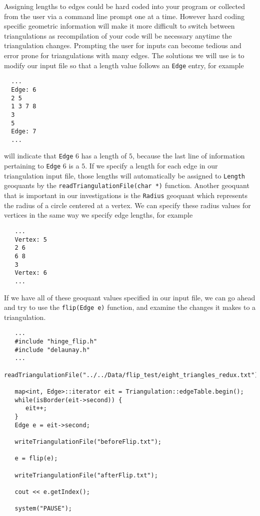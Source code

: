 \documentclass{amsart}
\theoremstyle{plain}
\numberwithin{equation}{section}
\begin{document}
Assigning lengths to edges could be hard coded into your program or collected from the user via a command line prompt one at a time. However hard coding specific geometric information will make it more difficult to switch between triangulations as recompilation of your code will be necessary anytime the triangulation changes. Prompting the user for inputs can become tedious and error prone for triangulations with many edges. The solutions we will use is to modify our input file so that a length value follows an \verb|Edge| entry, for example\\

\begin{verbatim}
  ...
  Edge: 6
  2 5
  1 3 7 8 
  3 
  5
  Edge: 7
  ...
\end{verbatim}

\bigskip

will indicate that \verb|Edge| $6$ has a length of $5$, because the last line of information pertaining to \verb|Edge| $6$ is a $5$. If we specify a length for each edge in our triangulation input file, those lengths will automatically be assigned to \verb|Length| geoquants by the \verb|readTriangulationFile(char *)| function. Another geoquant that is important in our investigations is the \verb|Radius| geoquant which represents the radius of a circle centered at a vertex. We can specify these radius values for vertices in the same way we specify edge lengths, for example\\

\begin{verbatim}
   ...
   Vertex: 5
   2 6 
   6 8 
   3
   Vertex: 6
   ...
\end{verbatim}

If we have all of these geoquant values specified in our input file, we can go ahead and try to use the \verb|flip(Edge e)| function, and examine the changes it makes to a triangulation.

\begin{verbatim}
   ...
   #include "hinge_flip.h"
   #include "delaunay.h"
   ...
   readTriangulationFile("../../Data/flip_test/eight_triangles_redux.txt");

   map<int, Edge>::iterator eit = Triangulation::edgeTable.begin();
   while(isBorder(eit->second)) {
      eit++;
   }
   Edge e = eit->second;

   writeTriangulationFile("beforeFlip.txt");

   e = flip(e);

   writeTriangulationFile("afterFlip.txt");
   
   cout << e.getIndex();
   
   system("PAUSE");
\end{verbatim}
\end{document}

